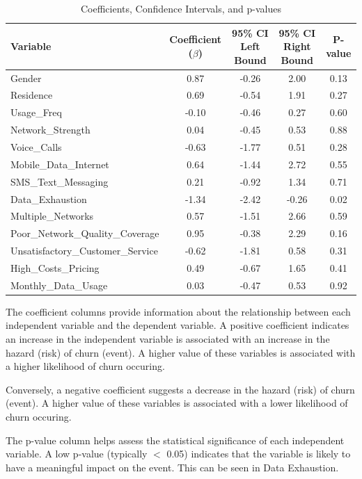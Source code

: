 \documentclass[doublespacing]{report} %
\begin{document}
\begin{table}[H]
\centering
\caption{Coefficients, Confidence Intervals, and p-values}
\begin{tabular}{lcccc}
\hline
Variable & Coefficient ($\beta$) & 95\% CI Left Bound & 95\% CI Right Bound & P-value\\
\hline
Gender & 0.87 & -0.26 & 2.00 & 0.13 \\
Residence & 0.69 & -0.54 & 1.91 & 0.27 \\
Usage\_Freq & -0.10 & -0.46 & 0.27 & 0.60 \\
Network\_Strength & 0.04 & -0.45 & 0.53 & 0.88 \\
Voice\_Calls & -0.63 & -1.77 & 0.51 & 0.28 \\
Mobile\_Data\_Internet & 0.64 & -1.44 & 2.72 & 0.55 \\
SMS\_Text\_Messaging & 0.21 & -0.92 & 1.34 & 0.71 \\
Data\_Exhaustion & -1.34 & -2.42 & -0.26 & 0.02 \\
Multiple\_Networks & 0.57 & -1.51 & 2.66 & 0.59 \\
Poor\_Network\_Quality\_Coverage & 0.95 & -0.38 & 2.29 & 0.16 \\
Unsatisfactory\_Customer\_Service & -0.62 & -1.81 & 0.58 & 0.31 \\
High\_Costs\_Pricing & 0.49 & -0.67 & 1.65 & 0.41 \\
Monthly\_Data\_Usage & 0.03 & -0.47 & 0.53 & 0.92 \\
\hline
\end{tabular}
\label{tab:Cox-ph Coefficeint}
\end{table}



The coefficient columns provide information about the relationship between each independent variable and the dependent variable. A positive coefficient indicates an increase in the independent variable is associated with an increase in the hazard (risk) of churn (event). A higher value of these variables is associated with a higher likelihood of churn occuring. 

Conversely, a negative coefficient suggests a decrease in the hazard (risk) of churn (event). A higher value of these variables is associated with a lower likelihood of churn occuring.

The p-value column helps assess the statistical significance of each independent variable. A low p-value (typically  \(<\) 0.05) indicates that the variable is likely to have a meaningful impact on the event. This can be seen in Data Exhaustion.
\end{document}
